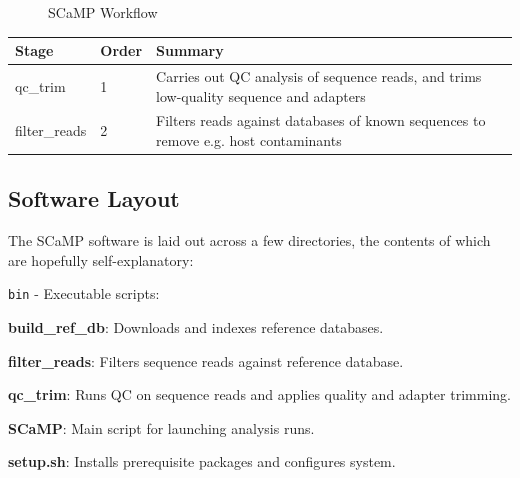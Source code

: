 \documentclass[a4paper,10pt]{article}
\newenvironment{tight_itemize}{
\begin{itemize}
  \setlength{\itemsep}{0pt}
  \setlength{\parskip}{0pt}
}{\end{itemize}}
\begin{document}
\begin{figure}[!h] 
\caption{SCaMP Workflow} \label{fig:scamp_workflow} \end{figure}

\begin{table}[htb]
\begin{tabular}{lll}
\hline
\textbf {Stage} & \textbf {Order}  & \textbf{Summary} \\
\hline
qc\_trim			& 	1 	&	Carries out QC analysis of sequence reads, and trims low-quality sequence and adapters \\
filter\_reads 	&	2	&	Filters reads against databases of known sequences to remove e.g. host contaminants \\
\hline
\end{tabular}
\label{tab:scamp_stages}
\end{table}

\subsection{Software Layout}

The SCaMP software is laid out across a few directories, the contents of which
are hopefully self-explanatory:

{\tt bin} - Executable scripts:
\begin{tight_itemize}
\item \textbf{build\_ref\_db}: Downloads and indexes reference databases.
\item \textbf{filter\_reads}: Filters sequence reads against reference database.
\item \textbf{qc\_trim}: Runs QC on sequence reads and applies quality and adapter trimming.
\item \textbf{SCaMP}: Main script for launching analysis runs.
\item \textbf{setup.sh}: Installs prerequisite packages and configures system.
\end{tight_itemize}
\end{document}
